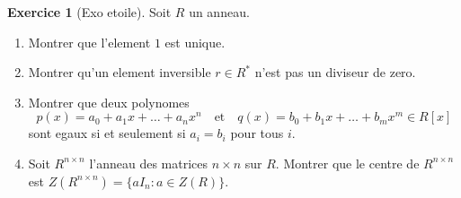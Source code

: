 \documentclass[a4paper,12pt,french]{report}
\theoremstyle{plain}
\theoremstyle{definition}
\newtheorem{exercise}{Exercice}[chapter]
\begin{document}
\begin{exercise}[Exo etoile]
Soit $R$ un anneau.
\begin{enumerate}
\item Montrer que l'element $1$ est unique.
\item Montrer qu'un element inversible $r\in R^{*}$ n'est pas un diviseur de zero.
\item Montrer que deux polynomes 
$$
p(x)=a_{0}+a_{1}x+\dots+a_{n}x^{n}\quad\text{et}\quad q(x)=b_{0}+b_{1}x+\dots+b_{m}x^{m}\in R[x]
$$
sont egaux si et seulement si $a_{i}=b_{i}$ pour tous $i$.
\item Soit $R^{n\times n}$ l'anneau des matrices $n\times n$ sur $R$. Montrer que le centre de $R^{n\times n}$ est $Z(R^{n\times n})=\{ aI_{n}:a\in Z(R) \}$.
\end{enumerate}
\end{exercise}
\end{document}
